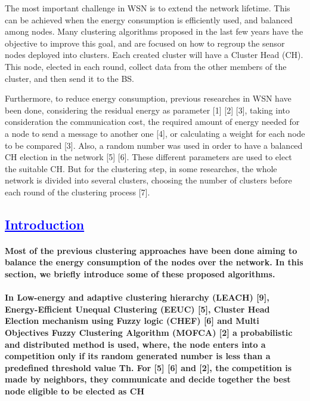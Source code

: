 \documentclass[12 pt]{article}
\begin{document}
\vspace{3cm}
\qquad
\center
The most important challenge in WSN is to extend the
network lifetime. This can be achieved when the energy
consumption is efficiently used, and balanced among nodes.
Many clustering algorithms proposed in the last few years
have the objective to improve this goal, and are focused on
how to regroup the sensor nodes deployed into clusters. Each
created cluster will have a Cluster Head (CH). This node,
elected in each round, collect data from the other members of
the cluster, and then send it to the BS.

\vspace{3cm}
\qquad
\flushleft
Furthermore, to reduce energy consumption, previous
researches in WSN have been done, considering the residual
energy as parameter [1] [2] [3], taking into consideration the
communication cost, the required amount of energy needed for
a node to send a message to another one [4], or calculating a
weight for each node to be compared [3]. Also, a random
number was used in order to have a balanced CH election in
the network [5] [6]. These different parameters are used to
elect the suitable CH. But for the clustering step, in some
researches, the whole network is divided into several clusters,
choosing the number of clusters before each round of the
clustering process [7].


\newpage
\setcounter{section}{0} 

\textcolor {blue} { \section{\ul{Introduction}}   }

\paragraph{\qquad
 Most of the previous clustering approaches have been done aiming to balance the energy consumption of the nodes over the network. In this section, we briefly introduce some of these proposed algorithms.}
\raggedleft

\paragraph{\qquad
In Low-energy and adaptive clustering hierarchy (LEACH) [9], Energy-Efficient Unequal Clustering (EEUC) [5], Cluster Head Election mechanism using Fuzzy logic (CHEF) [6] and Multi Objectives Fuzzy Clustering Algorithm (MOFCA) [2] a probabilistic and distributed method is used, where, the node enters into a competition only if its random generated number is less than a predefined threshold value Th. For [5] [6] and [2], the competition is made by neighbors, they communicate and decide together the best node eligible to be elected as CH }\centering
\vspace{3cm}
\end{document}

